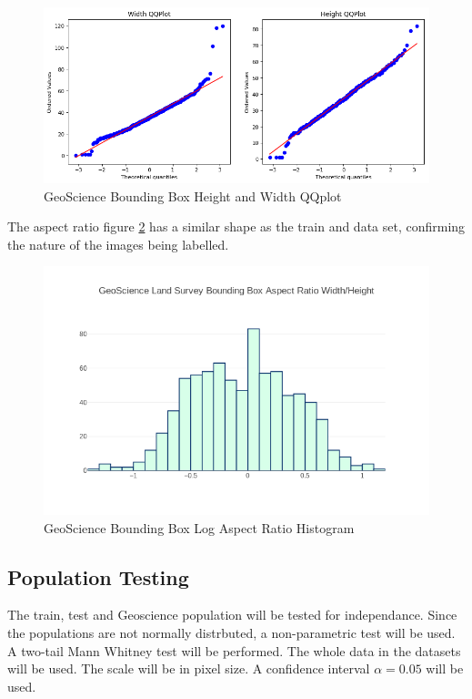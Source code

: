 \documentclass{article}
\begin{document}
\begin{figure}[h]
\centering
\label{geodroneqqplot}
\includegraphics[scale=0.4]{images/geoscience-qqplot.png}
\caption{GeoScience Bounding Box Height and Width QQplot}
\end{figure}

The aspect ratio figure \ref{geodroneaspect} has a similar shape as the train and data set, confirming the nature of the images being labelled. 

\begin{figure}[ht]
\centering
\label{geodroneaspect}
\includegraphics[scale=0.4]{images/geoscience-aspect.png}
\caption{GeoScience Bounding Box Log Aspect Ratio Histogram}
\end{figure}

\subsection{Population Testing}

The train, test and Geoscience population will be tested for independance. Since the populations are not normally distrbuted, a non-parametric test will be used. A two-tail Mann Whitney test will be performed. The whole data in the datasets will be used. The scale will be in pixel size. A confidence interval $\alpha = 0.05$ will be used.
\end{document}
